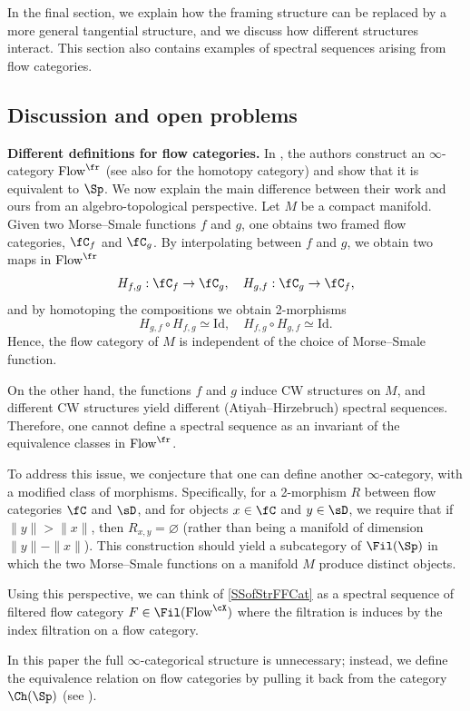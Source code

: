 In the final section, we explain how the framing structure can be replaced by a more general tangential structure, and we discuss how different structures interact. This section also contains examples of spectral sequences arising from flow categories.

\subsection*{Discussion and open problems}
\textbf{Different definitions for flow categories.} In \cite{abouzaid2024foundation}, the authors construct an $\infty$-category $\mathrm{Flow}^{\fr}$ (see also \cite{porcelli2024bordism} for the homotopy category) and show that it is equivalent to $\Sp$. We now explain the main difference between their work and ours from an algebro-topological perspective. Let $M$ be a compact manifold. Given two Morse–Smale functions $f$ and $g$, one obtains two framed flow categories, $\fC_f$ and $\fC_g$. By interpolating between $f$ and $g$, we obtain two maps in $\mathrm{Flow}^{\fr}$
\[
    H_{f,g}: \fC_f \to \fC_g, \quad H_{g,f}: \fC_g \to \fC_f,
\]
and by homotoping the compositions we obtain 2-morphisms
\[
    H_{g,f} \circ H_{f,g} \simeq \mathrm{Id}, \quad H_{f,g} \circ H_{g,f} \simeq \mathrm{Id}.
\]
Hence, the flow category of $M$ is independent of the choice of Morse–Smale function.

On the other hand, the functions $f$ and $g$ induce CW structures on $M$, and different CW structures yield different (Atiyah–Hirzebruch) spectral sequences. Therefore, one cannot define a spectral sequence as an invariant of the equivalence classes in $\mathrm{Flow}^{\fr}$.

To address this issue, we conjecture that one can define another $\infty$-category, with a modified class of morphisms. Specifically, for a 2-morphism $R$ between flow categories $\fC$ and $\sD$, and for objects $x \in \fC$ and $y \in \sD$, we require that if $\|y\| > \|x\|$, then $R_{x,y} = \varnothing$ (rather than being a manifold of dimension $\|y\| - \|x\|$). This construction should yield a subcategory of $\Fil(\Sp)$ in which the two Morse–Smale functions on a manifold $M$ produce distinct objects.

Using this perspective, we can think of \cref{SSofStrFFCat} as a spectral sequence of filtered flow category $F \in \Fil(\mathrm{Flow}^{\cX})$ where the filtration is induces by the index filtration on a flow category.

In this paper the full $\infty$-categorical structure is unnecessary; instead, we define the equivalence relation on flow categories by pulling it back from the category $\Ch(\Sp)$ (see ).